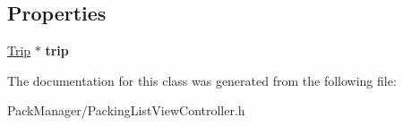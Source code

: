 \subsection*{Properties}
\begin{DoxyCompactItemize}
\item 
\hypertarget{interface_packing_list_view_controller_a8b787a4da59417e81ccb864f17fd1282}{\hyperlink{interface_trip}{Trip} $\ast$ {\bfseries trip}}\label{interface_packing_list_view_controller_a8b787a4da59417e81ccb864f17fd1282}

\end{DoxyCompactItemize}


The documentation for this class was generated from the following file\-:\begin{DoxyCompactItemize}
\item 
Pack\-Manager/Packing\-List\-View\-Controller.\-h\end{DoxyCompactItemize}
